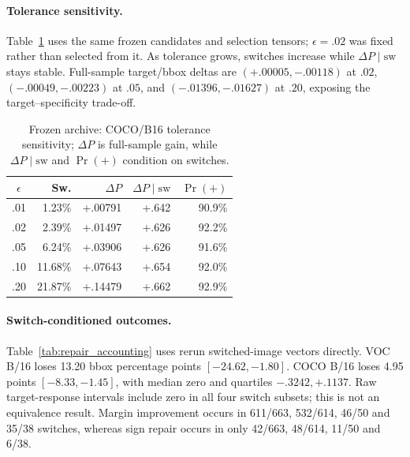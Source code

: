 \documentclass[10pt]{article}
\begin{document}
\paragraph{Tolerance sensitivity.}
Table~\ref{tab:frontier} uses the same frozen candidates and selection tensors;
$\epsilon=.02$ was fixed rather than selected from it. As tolerance grows, switches
increase while $\Delta P\mid\mathrm{sw}$ stays stable. Full-sample target/bbox deltas
are $(+.00005,-.00118)$ at $.02$, $(-.00049,-.00223)$ at $.05$, and
$(-.01396,-.01627)$ at $.20$, exposing the target--specificity trade-off.

\begin{table}[!t]
\centering
\caption{Frozen archive: COCO/B16 tolerance sensitivity; $\Delta P$ is full-sample gain, while $\Delta P\mid\mathrm{sw}$ and $\Pr(+)$ condition on switches.}
\label{tab:frontier}
\small
\setlength{\tabcolsep}{2.0pt}
\renewcommand{\arraystretch}{1.04}
\begin{tabular*}{\columnwidth}{@{\extracolsep{\fill}}crrrr@{}}
\toprule
$\epsilon$ & Sw. & $\Delta P$ & $\Delta P\mid\mathrm{sw}$ & $\Pr(+)$\\
\midrule
.01 & 1.23\% & +.00791 & +.642 & 90.9\%\\
.02 & 2.39\% & +.01497 & +.626 & 92.2\%\\
.05 & 6.24\% & +.03906 & +.626 & 91.6\%\\
.10 & 11.68\% & +.07643 & +.654 & 92.0\%\\
.20 & 21.87\% & +.14479 & +.662 & 92.9\%\\
\bottomrule
\end{tabular*}
\end{table}

\paragraph{Switch-conditioned outcomes.}
Table~\ref{tab:repair_accounting} uses rerun switched-image vectors directly.
VOC B/16 loses 13.20 bbox percentage points $[-24.62,-1.80]$.
COCO B/16 loses 4.95 points $[-8.33,-1.45]$, with median zero and
quartiles $-.3242,+.1137$. Raw target-response intervals include zero in all
four switch subsets; this is not an equivalence result. Margin improvement
occurs in 611/663, 532/614, 46/50 and 35/38 switches, whereas sign repair
occurs in only 42/663, 48/614, 11/50 and 6/38.
\end{document}
